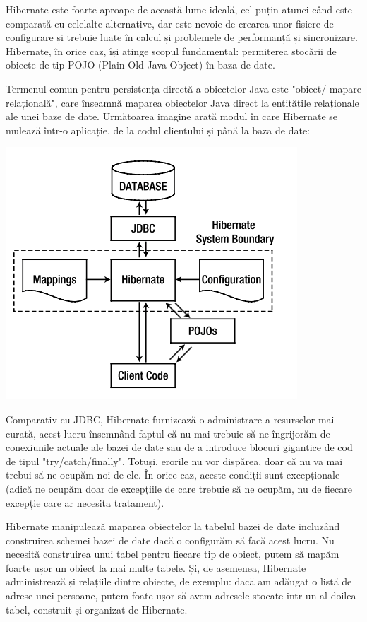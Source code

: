 \documentclass[12pt]{book}
\begin{document}
Hibernate este foarte aproape de această lume ideală, cel puțin atunci când este comparată cu celelalte alternative, dar este nevoie de crearea unor fișiere de configurare și trebuie luate în calcul și problemele de performanță și sincronizare. Hibernate, în orice caz, își atinge scopul fundamental: permiterea stocării de obiecte de tip POJO (Plain Old Java Object) în baza de date. 

Termenul comun pentru persistența directă a obiectelor Java este "obiect/ mapare relațională", care înseamnă maparea obiectelor Java direct la entitățile relaționale ale unei baze de date. Următoarea imagine arată modul în care Hibernate se mulează într-o aplicație, de la codul clientului și până la baza de date:
\begin{center}
	\includegraphics{Hibernate}
\end{center}

Comparativ cu JDBC, Hibernate furnizează o administrare a resurselor mai curată, acest lucru însemnând faptul că nu mai trebuie să ne îngrijorăm de conexiunile actuale ale bazei de date sau de a introduce blocuri gigantice de cod de tipul "try/catch/finally".
Totuși, erorile nu vor dispărea, doar că nu va mai trebui să ne ocupăm noi de ele. În orice caz, aceste condiții sunt excepționale (adică ne ocupăm doar de excepțiile de care trebuie să ne ocupăm, nu de fiecare excepție care ar necesita tratament).

Hibernate manipulează maparea obiectelor la tabelul bazei de date incluzând construirea schemei bazei de date dacă o configurăm să facă acest lucru. Nu necesită construirea unui tabel pentru fiecare tip de obiect, putem să mapăm foarte ușor un obiect la mai multe tabele. Și, de asemenea, Hibernate administrează și relațiile dintre obiecte, de exemplu: dacă am adăugat o listă de adrese unei persoane, putem foate ușor să avem adresele stocate intr-un al doilea tabel, construit și organizat de Hibernate.
\end{document}

